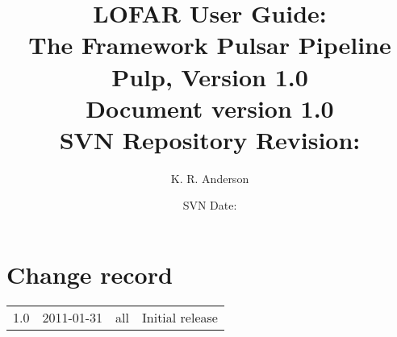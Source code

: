 \documentclass[a4paper,10pt,bibtotoc]{scrartcl}
\begin{document}

\title{LOFAR User Guide: \\ The Framework Pulsar Pipeline\\
{\large Pulp, Version 1.0} \\ 
{\normalsize Document version 1.0} \\
{\normalsize SVN Repository Revision: \svnInfoRevision}}
\author{K. R. Anderson}
\date{\small{SVN Date: \svnInfoDate}}
\maketitle

\tableofcontents

\clearpage


\section*{Change record}

\begin{center}
  \tablelasttail{\hline}
  \begin{supertabular}{lllp{10cm}}
    1.0 & 2011-01-31 & all & Initial release \\
  \end{supertabular}
\end{center}

\end{document}
